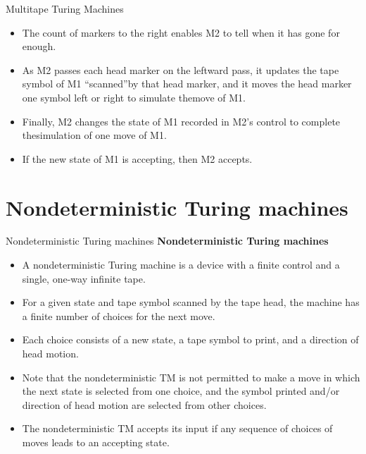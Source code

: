\documentclass{beamer}
\begin{document}
\begin{frame}{ Multitape Turing Machines}
	\begin{itemize}
		\item The count of markers to the right enables M2 to tell when it has gone for enough.
		\item  As M2 passes each head marker on the leftward pass, it updates the tape symbol of M1 “scanned”by that head marker, and it moves the head marker one symbol left or right to simulate themove of M1.
		\item  Finally, M2 changes the state of M1 recorded in M2’s control to complete thesimulation of one move of M1.
		\item   If the new state of M1 is accepting, then M2 accepts.
	\end{itemize}
\end{frame}
\section{Nondeterministic Turing machines}
\begin{frame}{Nondeterministic Turing machines}
\textbf{Nondeterministic Turing machines}
\begin{itemize}
	\item A nondeterministic Turing machine is a device with a finite control and a single, one-way infinite 
	tape.
	\item For a given state and tape symbol scanned by the tape head, the machine has a finite number of 
	choices for the next move.
	\item Each choice consists of a new state, a tape symbol to print, and a direction 
	of head motion.
	\item Note that the nondeterministic TM is not permitted to make a move in which the next 
	state is selected from one choice, and the symbol printed and/or direction of head motion are selected 
	from other choices.
	\item The nondeterministic TM accepts its input if any sequence of choices of moves leads to an accepting state.
	
\end{itemize}
\end{frame}
\end{document}
